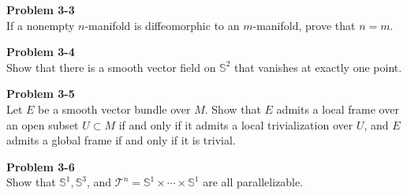 \documentclass[12pt, a4paper]{article}
\theoremstyle{plain}
\newcommand{\set}[1]{\mathbb{#1}}
\newcommand{\T}{\mathcal{T}}
\newenvironment{problem}[2][Problem]
    { \begin{mdframed}[backgroundcolor=gray!20] \textbf{#1 #2} \\}
    {  \end{mdframed}}
\begin{document}
\begin{problem}{3-3}
    If a nonempty $n$-manifold is diffeomorphic to an $m$-manifold, prove that $n=m$.
\end{problem}


\begin{problem}{3-4}
    Show that there is a smooth vector field on $\set{S}^2$ that vanishes at exactly one point.
\end{problem}

\begin{problem}{3-5}
    Let $E$ be a smooth vector bundle over $M$. Show that $E$ admits a local frame over an open subset $U\subset M$ if and only if it admits a local trivialization over $U$, and $E$ admits a global frame if and only if it is trivial.
\end{problem}

\begin{problem}{3-6}
    Show that $\set{S}^1,\set{S}^3$, and $\T^n=\set{S}^1\times\cdots\times \set{S}^1$ are all parallelizable.
\end{problem}









\end{document}

